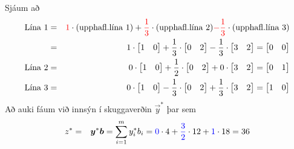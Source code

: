 \begin{lausn}Sjáum að 
\begin{eqnarray*}
\textrm{Lína 1} &=& {\color{red}{1}} \cdot\textrm{(upphafl.lína 1)}+{\color{red}{\frac{1}{3}}}\cdot\textrm{(upphafl.lína 2)}{\color{red}{-\frac{1}{3}}}\cdot\textrm{(upphafl.lína 3)}\\
&=& 1\cdot\begin{bmatrix}1 & 0 \end{bmatrix}+\frac{1}{3}\cdot\begin{bmatrix}0 & 2\end{bmatrix}-\frac{1}{3}\cdot\begin{bmatrix}3 & 2\end{bmatrix} = \begin{bmatrix} 0 & 0\end{bmatrix} \\
\textrm{Lína 2} &=& 0\cdot\begin{bmatrix}1 & 0 \end{bmatrix}+\frac{1}{2}\cdot\begin{bmatrix}0 & 2\end{bmatrix}+0\cdot\begin{bmatrix}3 & 2\end{bmatrix} = \begin{bmatrix} 0 & 1\end{bmatrix} \\
\textrm{Lína 3} &=& 0\cdot\begin{bmatrix}1 & 0 \end{bmatrix}-\frac{1}{3}\cdot\begin{bmatrix}0 & 2\end{bmatrix}+\frac{1}{3}\cdot\begin{bmatrix}3 & 2\end{bmatrix} = \begin{bmatrix} 1 & 0\end{bmatrix} 
\end{eqnarray*}
Að auki fáum við innsýn í skuggaverðin $\vec{y}^*$ þar sem 
\begin{eqnarray*}
z^*&=&\vec{y}^*\vec{b}= \sum_{i=1}^m y_i^*b_i={\color{blue}{0}}\cdot4+{\color{blue}{\frac{3}{2}}}\cdot12+{\color{blue}{1}}\cdot18=36 
\end{eqnarray*}
 \end{lausn}

